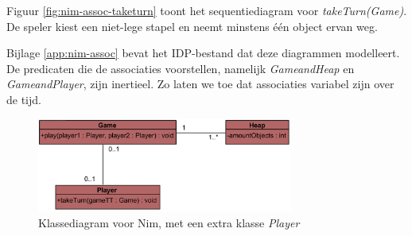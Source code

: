 Figuur \ref{fig:nim-assoc-taketurn} toont het sequentiediagram voor \textit{takeTurn(Game)}. De speler kiest een niet-lege stapel en neemt minstens \'e\'en object ervan weg.

Bijlage \ref{app:nim-assoc} bevat het IDP-bestand dat deze diagrammen modelleert. De predicaten die de associaties voorstellen, namelijk \textit{GameandHeap} en \textit{GameandPlayer}, zijn inertieel. Zo laten we toe dat associaties variabel zijn over de tijd.

\begin{figure}
	\centering
	\includegraphics[width=0.75\textwidth]{chap-declaratieve-seq/nim-assoc-cd.png}
	\caption{Klassediagram voor Nim, met een extra klasse \textit{Player}}
	\label{fig:nim-assoc-cd}
\end{figure}

